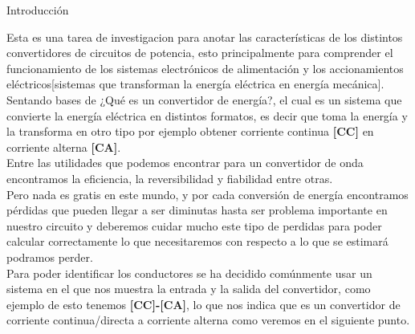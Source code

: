 \documentclass[a3paper,12pt]{article}
\begin{document}
{

\begin {section}{\color{cyan}\huge{Introducción}}
	

{\LARGE Esta es una tarea de investigacion para anotar las características de los distintos convertidores de circuitos de potencia, esto principalmente para comprender el funcionamiento de los sistemas electrónicos de alimentación y los accionamientos eléctricos[sistemas que transforman la energía eléctrica en energía mecánica]. Sentando bases de ¿Qué es un convertidor de energía?, el cual es un sistema que convierte la energía eléctrica en distintos formatos, es decir que toma la energía y la transforma en otro tipo por ejemplo obtener corriente continua \textbf{[CC]} en corriente alterna \textbf{[CA]}. 
\\Entre las utilidades que podemos encontrar para un convertidor de onda encontramos la eficiencia, la reversibilidad y fiabilidad entre otras. \\
Pero nada es gratis en este mundo, y por cada conversión de energía encontramos pérdidas que pueden llegar a ser diminutas hasta ser problema importante en nuestro circuito y deberemos cuidar mucho este tipo de perdidas para poder calcular correctamente lo que necesitaremos con respecto a lo que se estimará podramos perder.\\
Para poder identificar los conductores se ha decidido comúnmente usar un sistema en el que nos muestra la entrada y la salida del convertidor, como ejemplo de esto tenemos \textbf{[CC]-[CA]}, lo que nos indica que es un convertidor de corriente continua/directa a corriente alterna como veremos en el siguiente punto.
}

\end{section}
}	

\vspace{.8cm}
\end{document}
